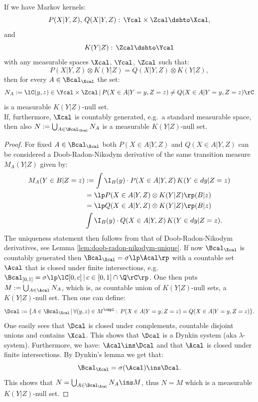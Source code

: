 \begin{Lem}
    \label{ess-unique}
    If we have Markov kernels:    
    \[P(X|Y,Z),\,Q(X|Y,Z):\, \Ycal\times \Zcal \dshto \Xcal,\]
    and 
    \[K(Y|Z):\,\Zcal \dshto \Ycal\]
    with any measurable spaces $\Xcal$, $\Ycal$, $\Zcal$ such that:
    \[ P(X|Y,Z) \otimes K(Y|Z) = Q(X|Y,Z) \otimes K(Y|Z), \]
    then for every $A \in \Bcal_\Xcal$ the set:
    \[N_A := \lC (y,z) \in \Ycal \times \Zcal \,|\, P(X \in A|Y=y,Z=z) \neq Q(X \in A|Y=y,Z=z)\rC\]
     is a measurable $K(Y|Z)$-null set. \\
     If, furthermore, $\Xcal$ is countably generated, e.g.\ a standard measurable space,
     then also $N := \bigcup_{A \in \Bcal_\Xcal} N_A$ is a measurable $K(Y|Z)$-null set.
     \begin{proof}
         For fixed $A \in \Bcal_\Xcal$ both $P(X \in A|Y,Z)$ and $Q(X \in A|Y,Z)$ can be considered
         a Doob-Radon-Nikodym derivative of the same transition measure $M_A(Y|Z)$ given by:
         \begin{align*} M_A(Y \in B|Z=z)&:= \int \I_B(y) \cdot P(X \in A|Y,Z)\, K(Y \in dy|Z=z) \\
             & = \lp P(X \in A|Y,Z) \otimes K(Y|Z) \rp(B|z) \\
             & = \lp Q(X \in A|Y,Z) \otimes K(Y|Z) \rp(B|z) \\
             &\int \I_B(y) \cdot Q(X \in A|Y,Z)\, K(Y \in dy|Z=z).
         \end{align*}
         The uniqueness statement then follows from that of Doob-Radon-Nikodym derivatives, see Lemma \ref{lem:doob-radon-nikodym-unique}.
         If now $\Bcal_\Xcal$ is countably generated then $\Bcal_\Xcal =\sigma\lp \Acal\rp$ 
         with a countable set $\Acal$ that is closed under finite intersections, e.g.\ 
         $\Bcal_{[0,1]}=\sigma\lp\lC[0,c]\,|\, c \in [0,1] \cap \Q\rC\rp$. 
         One then puts $M:=\bigcup_{A \in \Acal} N_A$, which is, as countable union of $K(Y|Z)$-null sets, a $K(Y|Z)$-null set.
         Then one can define:
         \[ \Dcal := \{ A \in \Bcal_\Xcal \,|\, \forall (y,z) \in M^\cmpl:\, P(X \in A|Y=y,Z=z)=Q(X \in A|Y=y,Z=z) \}.\]
         One easily sees that $\Dcal$ is closed under complements, countable disjoint unions and contains $\Xcal$.
         This shows that $\Dcal$ is a Dynkin system (aka $\lambda$-system).
         Furthermore, we have: $\Acal \ins \Dcal$ and that $\Acal$ is closed under finite intersections. 
         By Dynkin's lemma we get that:
         \[\Bcal_\Xcal = \sigma(\Acal) \ins \Dcal.\]
         This shows that $N = \bigcup_{A \in \Bcal_\Xcal}N_A \ins M$, thus $N = M$ which is a measurable $K(Y|Z)$-null set.
     \end{proof}
 \end{Lem}


